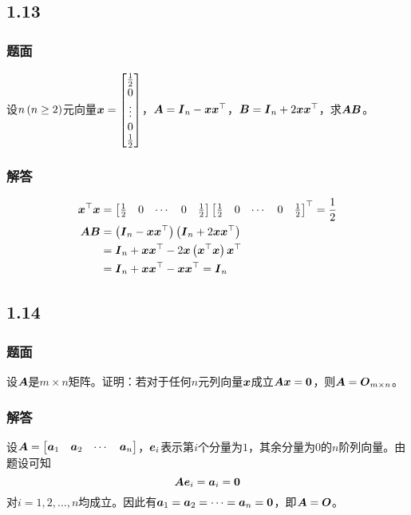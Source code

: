 \documentclass[9pt,xcolor=svgnames]{beamer} %
\begin{document}
\subsection*{1.13}
\begin{frame}
    \frametitle{题面}
    设\(n\left( n\ge2 \right)\)元向量\(\boldsymbol{x}=\begin{bmatrix}\frac12\\0\\\vdots\\0\\\frac12\end{bmatrix}\)，\(\boldsymbol{A}=\boldsymbol{I}_n-\boldsymbol{x}\boldsymbol{x}^\top\)，\(\boldsymbol{B}=\boldsymbol{I}_n+2\boldsymbol{x}\boldsymbol{x}^\top\)，求\(\boldsymbol{A}\boldsymbol{B}\)。
\end{frame}
\begin{frame}
    \frametitle{解答}
    \begin{align*}
        \boldsymbol{x}^\top\boldsymbol{x} & =
        \begin{bmatrix}
            \frac{1}{2} & 0 & \cdots & 0 & \frac{1}{2}
        \end{bmatrix}
        \begin{bmatrix}
            \frac{1}{2} & 0 & \cdots & 0 & \frac{1}{2}
        \end{bmatrix}^\top=\frac{1}{2}                                        \\
        \boldsymbol{A}\boldsymbol{B}      & =\left( \boldsymbol{I}_n-\boldsymbol{x}\boldsymbol{x}^\top \right)\left( \boldsymbol{I}_n+2\boldsymbol{x}\boldsymbol{x}^\top \right)  \\
                        & =\boldsymbol{I}_n+\boldsymbol{x}\boldsymbol{x}^\top-2\boldsymbol{x}\left( \boldsymbol{x}^\top\boldsymbol{x} \right)\boldsymbol{x}^\top \\
                        & =\boldsymbol{I}_n+\boldsymbol{x}\boldsymbol{x}^\top-\boldsymbol{x}\boldsymbol{x}^\top=\boldsymbol{I}_n
    \end{align*}
\end{frame}

\subsection*{1.14}
\begin{frame}
    \frametitle{题面}
    设\(\boldsymbol{A}\)是\(m\times n\)矩阵。证明：若对于任何\(n\)元列向量\(\boldsymbol{x}\)成立\(\boldsymbol{A}\boldsymbol{x}=\boldsymbol{0}\)，则\(\boldsymbol{A}=\boldsymbol{O}_{m\times n}\)。
\end{frame}
\begin{frame}
    \frametitle{解答}
    设\(\boldsymbol{A}=\begin{bmatrix}\boldsymbol{a}_1&\boldsymbol{a}_2&\cdots&\boldsymbol{a}_n\end{bmatrix}\)，\(\boldsymbol{e}_i\)表示第\(i\)个分量为\(1\)，其余分量为\(0\)的\(n\)阶列向量。由题设可知
    \begin{equation*}
        \boldsymbol{A}\boldsymbol{e}_i=\boldsymbol{a}_i=\boldsymbol{0}
    \end{equation*}
    对\(i=1,2,\dots,n\)均成立。因此有\(\boldsymbol{a}_1=\boldsymbol{a}_2=\cdots=\boldsymbol{a}_n=\boldsymbol{0}\)，即\(\boldsymbol{A}=\boldsymbol{O}\)。
\end{frame}
\end{document}

